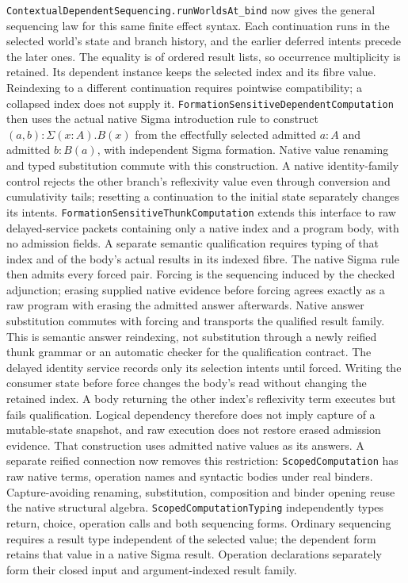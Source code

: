 \documentclass[11pt]{article}
\theoremstyle{definition}
\theoremstyle{remark}
\begin{document}
\nolinkurl{ContextualDependentSequencing.runWorldsAt_bind} now gives the
general sequencing law for this same finite effect syntax. Each continuation
runs in the selected world's state and branch history, and the earlier
deferred intents precede the later ones. The equality is of ordered result
lists, so occurrence multiplicity is retained. Its dependent instance keeps
the selected index and its fibre value. Reindexing to a different continuation
requires pointwise compatibility; a collapsed index does not supply it.
\nolinkurl{FormationSensitiveDependentComputation} then uses the actual native
Sigma introduction rule to construct $(a,b):\Sigma(x:A).B(x)$ from the
effectfully selected admitted $a:A$ and admitted $b:B(a)$, with independent
Sigma formation. Native value renaming and typed substitution commute with
this construction. A native identity-family control rejects the other
branch's reflexivity value even through conversion and cumulativity tails;
resetting a continuation to the initial state separately changes its intents.
\nolinkurl{FormationSensitiveThunkComputation} extends this interface to
raw delayed-service packets containing only a native index and a program
body, with no admission fields. A separate semantic qualification requires
typing of that index and of the body's actual results in its indexed fibre.
The native Sigma rule then admits every forced pair. Forcing is the
sequencing induced by the checked adjunction; erasing supplied native
evidence before forcing agrees exactly as a raw program with erasing the
admitted answer afterwards. Native answer substitution commutes with forcing
and transports the qualified result family. This is semantic answer
reindexing, not substitution through a newly reified thunk grammar or an
automatic checker for the qualification contract.
The delayed identity service records only its selection intents until forced.
Writing the consumer state before force changes the body's read without
changing the retained index. A body returning the other index's reflexivity
term executes but fails qualification. Logical dependency therefore does not
imply capture of a mutable-state snapshot, and raw execution does not restore
erased admission evidence.
That construction uses admitted native values as its answers. A separate
reified connection now removes this restriction:
\nolinkurl{ScopedComputation} has raw native terms, operation names and
syntactic bodies under real binders. Capture-avoiding renaming, substitution,
composition and binder opening reuse the native structural algebra.
\nolinkurl{ScopedComputationTyping} independently types return, choice,
operation calls and both sequencing forms. Ordinary sequencing requires a
result type independent of the selected value; the dependent form retains
that value in a native Sigma result. Operation declarations separately form
their closed input and argument-indexed result family.
\end{document}
